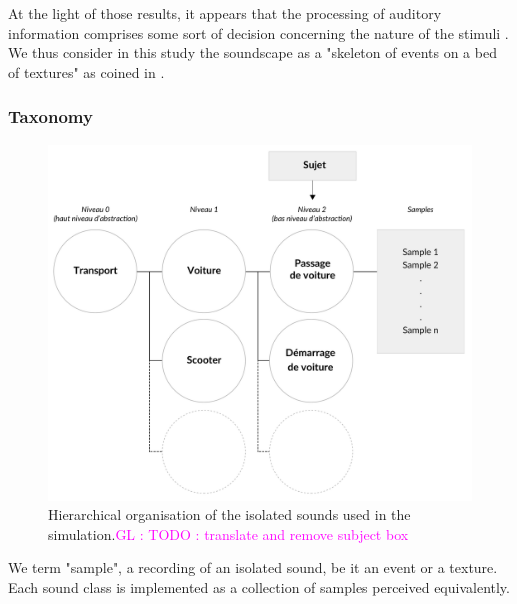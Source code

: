 \documentclass[12pt]{elsarticle}
\newcommand{\gl}[1]{\textcolor{magenta}{GL : #1}}
\newcommand{\ie}{\emph{i.\,e.}}
\newcommand{\cf}{cf.}
\newcommand{\myfloatalign}{\centering}
\begin{document}
At the light of those results, it appears that the processing of auditory information comprises some sort of decision concerning the nature of the stimuli \cite{nelken2013ear,mcdermott2013summary}. We thus consider in this study the soundscape as a "skeleton of events on a bed of textures" as coined in \cite{nelken2013ear}.

\subsubsection*{Taxonomy}

\begin{figure}[t]
        \myfloatalign
        \includegraphics[width=.8\linewidth]{gfx/3.pdf}
       \caption{Hierarchical organisation of the isolated sounds used in the simulation.\gl{TODO : translate and remove subject box}}\label{fig:orgDb}
\end{figure}


We term "sample", a recording of an isolated sound, be it an event or a texture. Each sound class is implemented as a collection of samples perceived equivalently.

\end{document}
